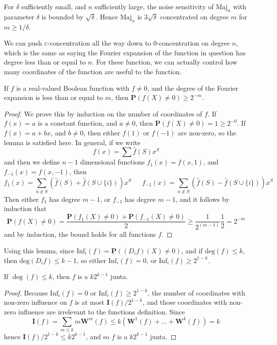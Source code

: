 \begin{example}
    For $\delta$ sufficiently small, and $n$ sufficiently large, the noise sensitivity of $\text{Maj}_n$ with parameter $\delta$ is bounded by $\sqrt{\delta}$. Hence $\text{Maj}_n$ is $3\sqrt{\delta}$ concentrated on degree $m$ for $m \geq 1/\delta$.
\end{example}

We can push $\varepsilon$-concentration all the way down to $0$-concentration on degree $n$, which is the same as saying the Fourier expansion of the function in question has degree less than or equal to $n$. For these function, we can actually control how many coordinates of the function are useful to the function.

\begin{lemma}
    If $f$ is a real-valued Boolean function with $f \neq 0$, and the degree of the Fourier expansion is less than or equal to $m$, then $\mathbf{P}(f(X) \neq 0) \geq 2^{-m}$.
\end{lemma}
\begin{proof}
    We prove this by induction on the number of coordinates of $f$. If $f(x) = a$ is a constant function, and $a \neq 0$, then $\mathbf{P}(f(X) \neq 0) = 1 \geq 2^{-0}$. If $f(x) = a + bx$, and $b \neq 0$, then either $f(1)$ or $f(-1)$ are non-zero, so the lemma is satisfied here. In general, if we write
    \[ f(x) = \sum \widehat{f}(S) x^S \]
    and then we define $n-1$ dimensional functions $f_1(x) = f(x,1)$, and $f_{-1}(x) = f(x,-1)$, then
    \[ f_1(x) = \sum_{n \not \in S} \left( \widehat{f}(S) + \widehat{f}(S \cup \{ i \}) \right) x^S\ \ \ \ \ \ \ f_{-1}(x) = \sum_{n \not \in S} \left( \widehat{f}(S) - \widehat{f}(S \cup \{ i \}) \right) x^S \]
    Then either $f_1$ has degree $m-1$, or $f_{-1}$ has degree $m-1$, and it follows by induction that
    \[ \mathbf{P}(f(X) \neq 0) = \frac{\mathbf{P}(f_1(X) \neq 0) + \mathbf{P}(f_{-1}(X) \neq 0)}{2} \geq \frac{1}{2^{(m-1)}} \frac{1}{2} = 2^{-m} \]
    and by induction, the bound holds for all functions $f$.
\end{proof}

Using this lemma, since $\text{Inf}_i(f) = \mathbf{P}((D_if)(X) \neq 0)$, and if $\text{deg}(f) \leq k$, then $\text{deg}(D_if) \leq k-1$, so either $\text{Inf}_i(f) = 0$, or $\text{Inf}_i(f) \geq 2^{1-k}$.

\begin{theorem}
    If $\deg(f) \leq k$, then $f$ is a $k2^{k-1}$ junta.
\end{theorem}
\begin{proof}
    Because $\text{Inf}_i(f) = 0$ or $\text{Inf}_i(f) \geq 2^{1-k}$, the number of coordinates with non-zero influence on $f$ is at most $\mathbf{I}(f)/2^{1-k}$, and those coordinates with non-zero influence are irrelevant to the functions definition. Since
    \[ \mathbf{I}(f) = \sum_{m \leq k} m \mathbf{W}^m(f) \leq k (\mathbf{W}^1(f) + \dots + \mathbf{W}^k(f)) = k \]
    hence $\mathbf{I}(f)/2^{1-k} \leq k2^{k-1}$, and so $f$ is a $k2^{k-1}$ junta.
\end{proof}

